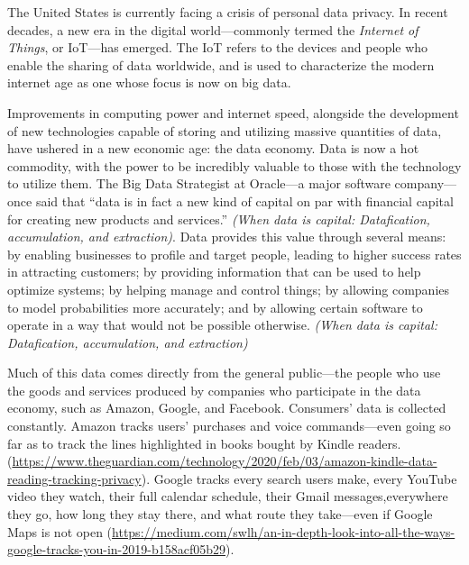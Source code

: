 \documentclass[water,article,submit,moreauthors,pdftex]{mdpi}
\begin{document}

The United States is currently facing a crisis of personal data privacy.
In recent decades, a new era in the digital world---commonly termed the
\emph{Internet of Things}, or IoT---has emerged. The IoT refers to the
devices and people who enable the sharing of data worldwide, and is used
to characterize the modern internet age as one whose focus is now on big
data.

Improvements in computing power and internet speed, alongside the
development of new technologies capable of storing and utilizing massive
quantities of data, have ushered in a new economic age: the data
economy. Data is now a hot commodity, with the power to be incredibly
valuable to those with the technology to utilize them. The Big Data
Strategist at Oracle---a major software company---once said that ``data
is in fact a new kind of capital on par with financial capital for
creating new products and services.'' \emph{(When data is capital:
Datafication, accumulation, and extraction)}. Data provides this value
through several means: by enabling businesses to profile and target
people, leading to higher success rates in attracting customers; by
providing information that can be used to help optimize systems; by
helping manage and control things; by allowing companies to model
probabilities more accurately; and by allowing certain software to
operate in a way that would not be possible otherwise. \emph{(When data
is capital: Datafication, accumulation, and extraction)}

Much of this data comes directly from the general public---the people
who use the goods and services produced by companies who participate in
the data economy, such as Amazon, Google, and Facebook. Consumers' data
is collected constantly. Amazon tracks users' purchases and voice
commands---even going so far as to track the lines highlighted in books
bought by Kindle readers.
(\url{https://www.theguardian.com/technology/2020/feb/03/amazon-kindle-data-reading-tracking-privacy}).
Google tracks every search users make, every YouTube video they watch,
their full calendar schedule, their Gmail messages,everywhere they go,
how long they stay there, and what route they take---even if Google Maps
is not open
(\url{https://medium.com/swlh/an-in-depth-look-into-all-the-ways-google-tracks-you-in-2019-b158acf05b29}).
\end{document}
